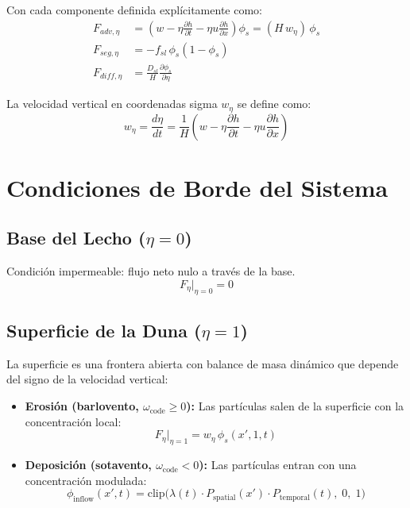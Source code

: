 \documentclass[11pt,a4paper]{article}
\begin{document}
Con cada componente definida explícitamente como:
\begin{align}
    F_{adv,\eta} &= \left(w - \eta\frac{\partial h}{\partial t} - \eta u \frac{\partial h}{\partial x}\right)\phi_s = (H \, w_\eta) \, \phi_s \\
    F_{seg,\eta} &= -f_{sl} \, \phi_s(1 - \phi_s) \\
    F_{diff,\eta} &= \frac{D_{sl}}{H}\frac{\partial \phi_s}{\partial \eta}
\end{align}

La velocidad vertical en coordenadas sigma $w_\eta$ se define como:
\begin{equation}
    w_\eta = \frac{d\eta}{dt} = \frac{1}{H}\left(w - \eta\frac{\partial h}{\partial t} - \eta u \frac{\partial h}{\partial x}\right)
\end{equation}


\section{Condiciones de Borde del Sistema}

\subsection{Base del Lecho ($\eta = 0$)}
Condición impermeable: flujo neto nulo a través de la base.
\begin{equation}
    F_\eta\big|_{\eta=0} = 0
\end{equation}

\subsection{Superficie de la Duna ($\eta = 1$)}
La superficie es una frontera abierta con balance de masa dinámico que depende del signo de la velocidad vertical:
\begin{itemize}
    \item \textbf{Erosión (barlovento, $\omega_{\text{code}} \ge 0$):} Las partículas salen de la superficie con la concentración local:
    \begin{equation}
        F_\eta\big|_{\eta=1} = w_\eta \, \phi_s(x', 1, t)
    \end{equation}
    \item \textbf{Deposición (sotavento, $\omega_{\text{code}} < 0$):} Las partículas entran con una concentración modulada:
    \begin{equation}
        \phi_{\text{inflow}}(x', t) = \text{clip}\Big(\lambda(t) \cdot P_{\text{spatial}}(x') \cdot P_{\text{temporal}}(t),\; 0,\; 1\Big)
    \end{equation}
\end{itemize}
\end{document}
